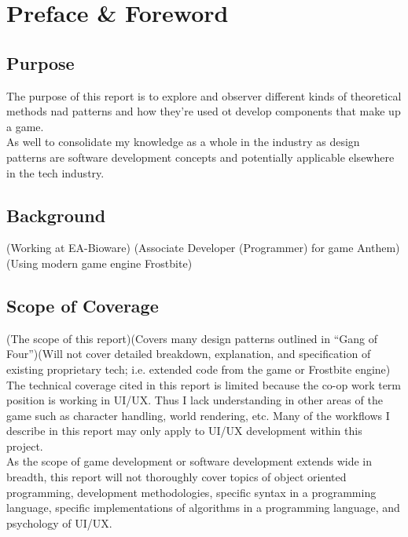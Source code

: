 
\section*{Preface \& Foreword}

\subsection*{Purpose}

The purpose of this report is to explore and observer different kinds of theoretical methods nad patterns and how they're used ot develop components that make up a game.\bs
\\
As well to consolidate my knowledge as a whole in the industry as design patterns are software development concepts and potentially applicable elsewhere in the tech industry.

\subsection*{Background}

(Working at EA-Bioware)
(Associate Developer (Programmer) for game Anthem)
(Using modern game engine Frostbite)

\subsection*{Scope of Coverage}

(The scope of this report)(Covers many design patterns outlined in ``Gang of Four'')(Will not cover detailed breakdown, explanation, and specification of existing proprietary tech; i.e. extended code from the game or Frostbite engine)\bs
\\
The technical coverage cited in this report is limited because the co-op work term position is working in UI/UX. Thus I lack understanding in other areas of the game such as character handling, world rendering, etc. Many of the workflows I describe in this report may only apply to UI/UX development within this project.\bs
\\
As the scope of game development or software development extends wide in breadth, this report will not thoroughly cover topics of object oriented programming, development methodologies, specific syntax in a programming language, specific implementations of algorithms in a programming language, and psychology of UI/UX.

